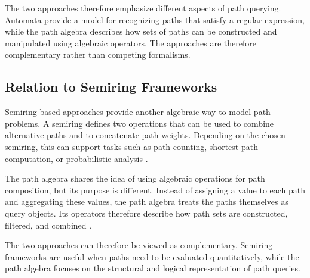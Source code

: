 The two approaches therefore emphasize different aspects of path querying. Automata provide a model for recognizing paths that satisfy a regular expression, while the path algebra describes how sets of paths can be constructed and manipulated using algebraic operators. The approaches are therefore complementary rather than competing formalisms.

\subsection{Relation to Semiring Frameworks}

Semiring-based approaches provide another algebraic way to model path problems. A semiring defines two operations that can be used to combine
alternative paths and to concatenate path weights. Depending on the chosen semiring, this can support tasks such as path counting, shortest-path computation, or probabilistic analysis \cite{rodriguez2011,garcia2022}.

The path algebra shares the idea of using algebraic operations for path composition, but its purpose is different. Instead of assigning a value to each path and aggregating these values, the path algebra treats the paths themselves as query objects. Its operators therefore describe how path sets are constructed, filtered, and combined \cite{angles2024path}.

The two approaches can therefore be viewed as complementary. Semiring frameworks are useful when paths need to be evaluated quantitatively, while the path algebra focuses on the structural and logical representation of path queries.